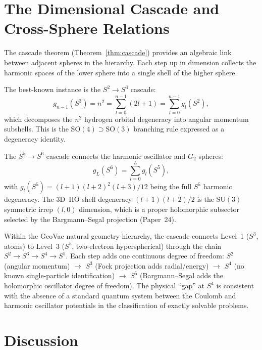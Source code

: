 \documentclass[twocolumn,pra,amsmath,amssymb,superscriptaddress]{revtex4-2}
\begin{document}
\section{The Dimensional Cascade and Cross-Sphere Relations}
\label{sec:cascade}

The cascade theorem (Theorem~\ref{thm:cascade}) provides an
algebraic link between adjacent spheres in the hierarchy.  Each
step up in dimension collects the harmonic spaces of the lower
sphere into a single shell of the higher sphere.

The best-known instance is the $S^2 \to S^3$ cascade:
\begin{equation}
g_{n-1}(S^3) = n^2 = \sum_{l=0}^{n-1} (2l+1) =
\sum_{l=0}^{n-1} g_l(S^2),
\end{equation}
which decomposes the $n^2$ hydrogen orbital degeneracy into angular
momentum subshells.  This is the $\mathrm{SO}(4) \supset
\mathrm{SO}(3)$ branching rule expressed as a degeneracy identity.

The $S^5 \to S^6$ cascade connects the harmonic oscillator and
$G_2$ spheres:
\begin{equation}
g_L(S^6) = \sum_{l=0}^{L} g_l(S^5),
\end{equation}
with $g_l(S^5) = (l+1)(l+2)^2(l+3)/12$ being the full $S^5$ harmonic
degeneracy.  The 3D~HO shell degeneracy $(l+1)(l+2)/2$ is the
$\mathrm{SU}(3)$ symmetric irrep $(l,0)$ dimension, which is a
proper holomorphic subsector selected by the Bargmann--Segal
projection (Paper~24).

Within the GeoVac natural geometry hierarchy, the cascade connects
Level~1 ($S^3$, atoms) to Level~3 ($S^5$, two-electron
hyperspherical) through the chain $S^2 \to S^3 \to S^4 \to S^5$.
Each step adds one continuous degree of freedom: $S^2$ (angular
momentum) $\to$ $S^3$ (Fock projection adds radial/energy) $\to$
$S^4$ (no known single-particle identification) $\to$ $S^5$
(Bargmann--Segal adds the holomorphic oscillator degree of freedom).
The physical ``gap'' at $S^4$ is consistent with the absence of a
standard quantum system between the Coulomb and harmonic oscillator
potentials in the classification of exactly solvable problems.

\section{Discussion}
\label{sec:discussion}
\end{document}
